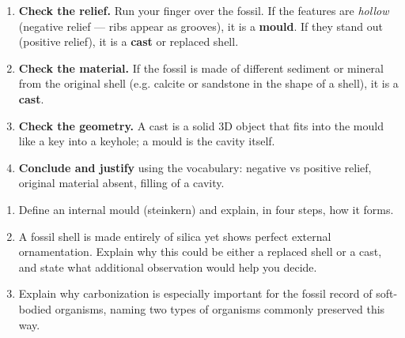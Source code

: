 \documentclass[11pt]{article}
\begin{document}
\begin{methode}
\begin{enumerate}
\item \textbf{Check the relief.} Run your finger over the fossil. If the features are \emph{hollow} (negative relief — ribs appear as grooves), it is a \textbf{mould}. If they stand out (positive relief), it is a \textbf{cast} or replaced shell.
\item \textbf{Check the material.} If the fossil is made of different sediment or mineral from the original shell (e.g. calcite or sandstone in the shape of a shell), it is a \textbf{cast}.
\item \textbf{Check the geometry.} A cast is a solid 3D object that fits into the mould like a key into a keyhole; a mould is the cavity itself.
\item \textbf{Conclude and justify} using the vocabulary: negative vs positive relief, original material absent, filling of a cavity.
\end{enumerate}
\end{methode}

\begin{exercice}
\begin{enumerate}
\item Define an internal mould (steinkern) and explain, in four steps, how it forms.
\item A fossil shell is made entirely of silica yet shows perfect external ornamentation. Explain why this could be either a replaced shell or a cast, and state what additional observation would help you decide.
\item Explain why carbonization is especially important for the fossil record of soft-bodied organisms, naming two types of organisms commonly preserved this way.
\end{enumerate}
\end{exercice}
\end{document}
